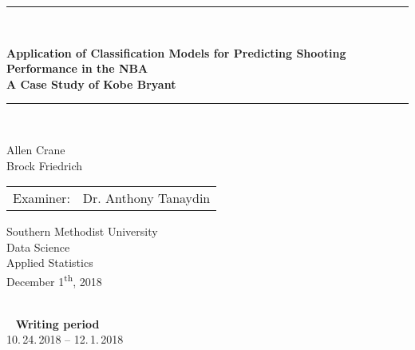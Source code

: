 
\begin{titlepage}
\begin{center}

\newcommand{\HorizontalLine}{\rule{\linewidth}{0.3mm}}




\HorizontalLine \\[0.4cm]
\begin{spacing}{3}
    {\huge \bfseries  Application of Classification Models for Predicting Shooting Performance in the NBA} \\
    {\Large \bfseries A Case Study of Kobe Bryant}
\end{spacing}
\HorizontalLine \\[1.5cm]

\begin{spacing}{3}
    {\Huge Allen Crane} \\
    {\Huge Brock Friedrich} \\[1.5cm]
\end{spacing}

\begin{tabular}[hc]{>{\huge}l >{\huge}l}
Examiner: & Dr. Anthony Tanaydin \\[0.3cm]
\end{tabular}
\vfill  %

\Large {
    Southern Methodist University\\
    Data Science\\
    Applied Statistics\\[0.5cm]
    December 1\textsuperscript{th}, 2018\\
}
\end{center}
\end{titlepage}

\ \vfill \ \\  %
\
\textbf{Writing period}            \smallskip{} \\
10.\,24.\,2018 -- 12.\,1.\,2018   \bigskip{} \\
\